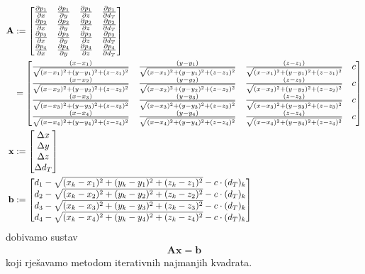 \documentclass[a4paper,twoside,12pt]{memoir} %
\begin{document}
\begin{align}\label{eq:definicijaSustava1}
\mathbf{A} & := \begin{bmatrix}
\frac{\partial p_1}{\partial x} &
\frac{\partial p_1}{\partial y} &
\frac{\partial p_1}{\partial z} &
\frac{\partial p_1}{\partial d_T} \\
\frac{\partial p_2}{\partial x} &
\frac{\partial p_2}{\partial y} &
\frac{\partial p_2}{\partial z} &
\frac{\partial p_2}{\partial d_T} \\
\frac{\partial p_3}{\partial x} &
\frac{\partial p_3}{\partial y} &
\frac{\partial p_3}{\partial z} &
\frac{\partial p_3}{\partial d_T} \\
\frac{\partial p_4}{\partial x} &
\frac{\partial p_4}{\partial y} &
\frac{\partial p_4}{\partial z} &
\frac{\partial p_4}{\partial d_T}
\end{bmatrix} \\
& = \begin{bmatrix}
\frac{(x-x_1)}{\sqrt{(x-x_1)^{2}+(y-y_1)^{2}+(z-z_1)^{2}}} & \frac{(y-y_1)}{\sqrt{(x-x_1)^{2}+(y-y_1)^{2}+(z-z_1)^{2}}} & \frac{(z-z_1)}{\sqrt{(x-x_1)^{2}+(y-y_1)^{2}+(z-z_1)^{2}}} & c \\
\frac{(x-x_2)}{\sqrt{(x-x_2)^{2}+(y-y_2)^{2}+(z-z_2)^{2}}} & \frac{(y-y_2)}{\sqrt{(x-x_2)^{2}+(y-y_2)^{2}+(z-z_2)^{2}}} & \frac{(z-z_2)}{\sqrt{(x-x_2)^{2}+(y-y_2)^{2}+(z-z_2)^{2}}} & c \\
\frac{(x-x_3)}{\sqrt{(x-x_3)^{2}+(y-y_3)^{2}+(z-z_3)^{2}}} & \frac{(y-y_3)}{\sqrt{(x-x_3)^{2}+(y-y_3)^{2}+(z-z_3)^{2}}} & \frac{(z-z_3)}{\sqrt{(x-x_3)^{2}+(y-y_3)^{2}+(z-z_3)^{2}}} & c \\
\frac{(x-x_4)}{\sqrt{(x-x_4)^{2}+(y-y_4)^{2}+(z-z_4)^{2}}} & \frac{(y-y_4)}{\sqrt{(x-x_4)^{2}+(y-y_4)^{2}+(z-z_4)^{2}}} & \frac{(z-z_4)}{\sqrt{(x-x_4)^{2}+(y-y_4)^{2}+(z-z_4)^{2}}} & c \\
\end{bmatrix} \notag \\
\mathbf{x} & :=  \begin{bmatrix}
\Delta x \\
\Delta y \\
\Delta z \\
\Delta d_T
\end{bmatrix} \\
\mathbf{b} & := \begin{bmatrix}
d_1 - \sqrt{(x_k-x_1)^{2}+(y_k-y_1)^{2}+(z_k-z_1)^{2}} - c\cdot (d_T)_k \\
d_2 - \sqrt{(x_k-x_2)^{2}+(y_k-y_2)^{2}+(z_k-z_2)^{2}} - c\cdot (d_T)_k \\
d_3 - \sqrt{(x_k-x_3)^{2}+(y_k-y_3)^{2}+(z_k-z_3)^{2}} - c\cdot (d_T)_k \\
d_4 - \sqrt{(x_k-x_4)^{2}+(y_k-y_4)^{2}+(z_k-z_4)^{2}} - c\cdot (d_T)_k
\end{bmatrix}
\end{align}%
dobivamo sustav
\begin{align}\label{eq:sustav}
\mathbf{A}\mathbf{x} = \mathbf{b}
\end{align}
koji rješavamo metodom iterativnih najmanjih kvadrata.\label{stranica:nastavakLS}
\end{document}
